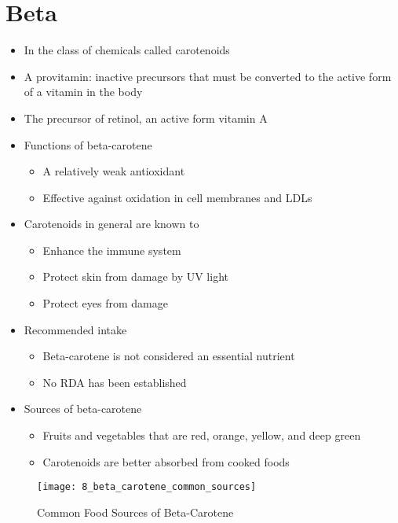 \documentclass[title={Chapter 8}]{fdsn201notes}
\begin{document}
\section{Beta}\label{sec:beta-carotene}
\begin{itemize}
	\item In the class of chemicals called carotenoids
	\item A provitamin: inactive precursors that must be converted to the active form of a vitamin in the body
	\item The precursor of retinol, an active form vitamin A
	\item Functions of beta-carotene
	\begin{itemize}
		\item A relatively weak antioxidant
		\item Effective against oxidation in cell membranes and LDLs
	\end{itemize}
	\item Carotenoids in general are known to
	\begin{itemize}
		\item Enhance the immune system
		\item Protect skin from damage by UV light
		\item Protect eyes from damage
	\end{itemize}
	\item Recommended intake
	\begin{itemize}
		\item Beta-carotene is not considered an essential nutrient
		\item No RDA has been established
	\end{itemize}
	\item Sources of beta-carotene
	\begin{itemize}
		\item Fruits and vegetables that are red, orange, yellow, and deep green
		\item Carotenoids are better absorbed from cooked foods
	\end{itemize}
\end{itemize}

\begin{figure}[H]
	\centering
	\texttt{[image: 8\_beta\_carotene\_common\_sources]}
	\caption{Common Food Sources of Beta-Carotene}
	\label{fig:common-food-sources-of-beta}
\end{figure}
\end{document}
